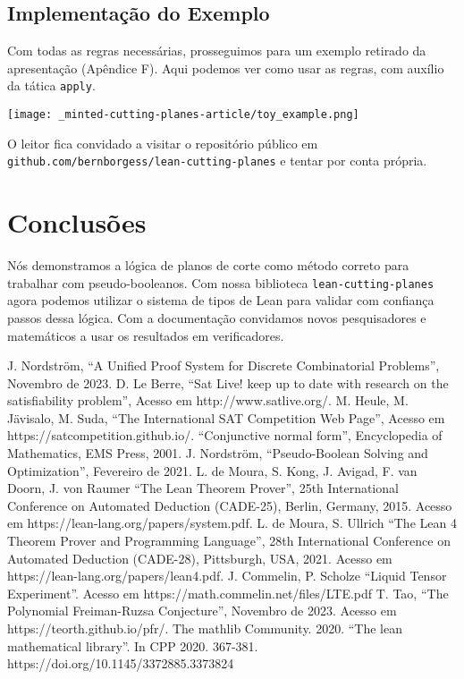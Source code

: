 \documentclass[conference]{IEEEtran}
\begin{document}

\newpage
\subsection{Implementação do Exemplo}
Com todas as regras necessárias, prosseguimos para um exemplo retirado da apresentação
(Apêndice F). Aqui podemos ver como usar as regras, com auxílio da tática \texttt{apply}.

\texttt{[image: \_minted-cutting-planes-article/toy\_example.png]}

O leitor fica convidado a visitar o repositório público em \texttt{github.com/bernborgess/lean-cutting-planes}
e tentar por conta própria.


\section*{Conclusões}
Nós demonstramos a lógica de planos de corte como método correto para trabalhar com pseudo-booleanos.
Com nossa biblioteca \texttt{lean-cutting-planes} agora podemos utilizar o sistema de tipos de Lean
para validar com confiança passos dessa lógica. Com a documentação convidamos novos pesquisadores e
matemáticos a usar os resultados em verificadores.


\begin{thebibliography}{00}
          J. Nordström, ``A Unified Proof System for Discrete Combinatorial Problems'', Novembro de 2023.
           D. Le Berre, ``Sat Live! keep up to date with research on the satisfiability problem'', Acesso em http://www.satlive.org/.
           M. Heule, M. Jävisalo, M. Suda, ``The International SAT Competition Web Page'', Acesso em https://satcompetition.github.io/.
               ``Conjunctive normal form'', Encyclopedia of Mathematics, EMS Press, 2001.
           J. Nordström, ``Pseudo-Boolean Solving and Optimization'', Fevereiro de 2021.
        L. de Moura, S. Kong, J. Avigad, F. van Doorn, J. von Raumer ``The Lean Theorem Prover'', 25th International Conference on Automated Deduction (CADE-25), Berlin, Germany, 2015. Acesso em https://lean-lang.org/papers/system.pdf.
             L. de Moura, S. Ullrich ``The Lean 4 Theorem Prover and Programming Language'', 28th International Conference on Automated Deduction (CADE-28), Pittsburgh, USA, 2021. Acesso em https://lean-lang.org/papers/lean4.pdf.
               J. Commelin, P. Scholze ``Liquid Tensor Experiment''. Acesso em https://math.commelin.net/files/LTE.pdf
               T. Tao, ``The Polynomial Freiman-Ruzsa Conjecture'', Novembro de 2023. Acesso em https://teorth.github.io/pfr/.
          The mathlib Community. 2020. ``The lean mathematical library''. In CPP 2020. 367-381. https://doi.org/10.1145/3372885.3373824
\end{thebibliography}
\end{document}

